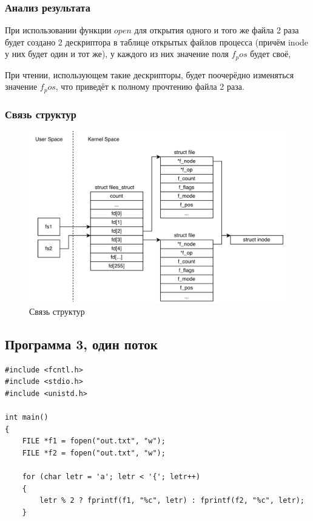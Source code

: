 \subsubsection*{Анализ результата}

При использовании функции $open$ для открытия одного и того же файла 2 раза будет создано 2 дескриптора в таблице открытых файлов процесса (причём inode  у них будет один и тот же), у каждого из них значение поля $f_pos$ будет своё,

При чтении, использующем такие дескрипторы, будет поочерёдно изменяться значение $f_pos$, что приведёт к полному прочтению файла 2 раза.

\clearpage

\subsubsection*{Связь структур}

\begin{figure}[h]
	\centering
	\captionsetup{justification=centering}
	\includegraphics[width=160mm]{img/prog2_diagram.png}
	\caption{Связь структур}
	\label{fig:prog-2-diagram}
\end{figure}

\subsection*{Программа 3, один поток}

\begin{center}
	\captionsetup{justification=raggedright,singlelinecheck=off}

	\begin{lstlisting}[label=lst:prog3-1,caption=Программа 3 --- один поток --- часть 1]
#include <fcntl.h>
#include <stdio.h>
#include <unistd.h>

int main() 
{
    FILE *f1 = fopen("out.txt", "w");
    FILE *f2 = fopen("out.txt", "w");

    for (char letr = 'a'; letr < '{'; letr++) 
    {
        letr % 2 ? fprintf(f1, "%c", letr) : fprintf(f2, "%c", letr);
    }
	\end{lstlisting}
\end{center}

